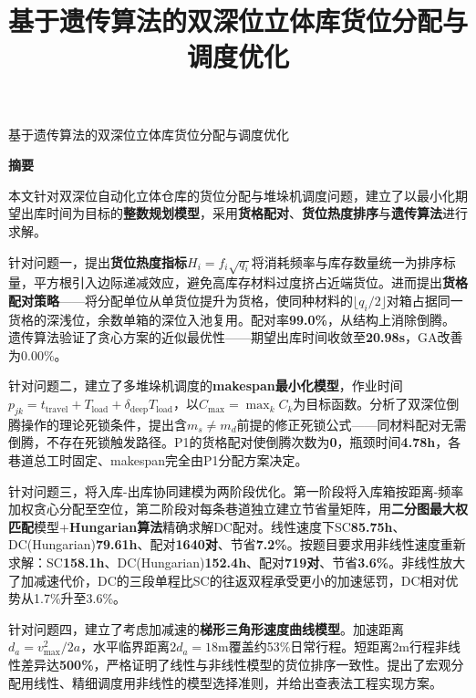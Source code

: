\documentclass[a4paper]{cumcmthesis}
\title{基于遗传算法的双深位立体库货位分配与调度优化}
\date{}
\begin{document}
\maketitle
{}

\newpage
\thispagestyle{empty}
\vspace*{-1.5cm}
\begin{center}
{\heiti\sanhao 基于遗传算法的双深位立体库货位分配与调度优化}
\vspace{0.8em}

{\heiti\xiaosanhao\textbf{摘\quad 要}}
\end{center}
\vspace{0.5em}

{\song\xiaosihao\setlength{\parindent}{2em}\setlength{\baselineskip}{20pt}

本文针对双深位自动化立体仓库的货位分配与堆垛机调度问题，建立了以最小化期望出库时间为目标的\textbf{整数规划模型}，采用\textbf{货格配对}、\textbf{货位热度排序}与\textbf{遗传算法}进行求解。

针对问题一，提出\textbf{货位热度指标}$H_i=f_i\sqrt{q_i}$将消耗频率与库存数量统一为排序标量，平方根引入边际递减效应，避免高库存材料过度挤占近端货位。进而提出\textbf{货格配对策略}——将分配单位从单货位提升为货格，使同种材料的$\lfloor q_i/2\rfloor$对箱占据同一货格的深浅位，余数单箱的深位入池复用。配对率\textbf{99.0\%}，从结构上消除倒腾。遗传算法验证了贪心方案的近似最优性——期望出库时间收敛至\textbf{20.98s}，GA改善为0.00\%。

针对问题二，建立了多堆垛机调度的\textbf{makespan最小化模型}，作业时间$p_{jk}=t_{\text{travel}}+T_{\text{load}}+\delta_{\text{deep}}T_{\text{load}}$，以$C_{\max}=\max_k C_k$为目标函数。分析了双深位倒腾操作的理论死锁条件，提出含$m_s\neq m_d$前提的修正死锁公式——同材料配对无需倒腾，不存在死锁触发路径。P1的货格配对使倒腾次数为\textbf{0}，瓶颈时间\textbf{4.78h}，各巷道总工时固定、makespan完全由P1分配方案决定。

针对问题三，将入库-出库协同建模为两阶段优化。第一阶段将入库箱按距离-频率加权贪心分配至空位，第二阶段对每条巷道独立建立节省量矩阵，用\textbf{二分图最大权匹配}模型+\textbf{Hungarian算法}精确求解DC配对。线性速度下SC\textbf{85.75h}、DC(Hungarian)\textbf{79.61h}、配对\textbf{1640对}、节省\textbf{7.2\%}。按题目要求用非线性速度重新求解：SC\textbf{158.1h}、DC(Hungarian)\textbf{152.4h}、配对\textbf{719对}、节省\textbf{3.6\%}。非线性放大了加减速代价，DC的三段单程比SC的往返双程承受更小的加速惩罚，DC相对优势从1.7\%升至3.6\%。

针对问题四，建立了考虑加减速的\textbf{梯形三角形速度曲线模型}。加速距离$d_a=v_{\max}^2/2a$，水平临界距离$2d_a=18$m覆盖约53\%日常行程。短距离2m行程非线性差异达\textbf{500\%}，严格证明了线性与非线性模型的货位排序一致性。提出了宏观分配用线性、精细调度用非线性的模型选择准则，并给出查表法工程实现方案。

}
\end{document}
